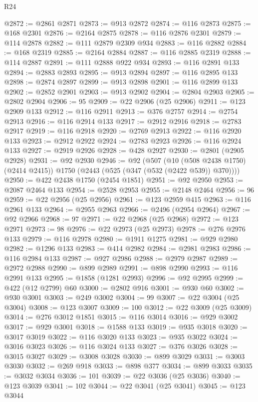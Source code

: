 \begin{lexlean}{R24}
\begin{coremodule}
{{{{{{{{{{{{{{{{{{{{{{{{{{{{{{{{{{{{{{{{{{{{{{{{{{{{{{{{{{{{{{{{{{{{{{{{{{{{{{{{{{{{{{{{{{{{{{{{{{{{{{{{{{{{{{{{{{{{{{{{{{{{{{{{{{{{{{{{{{{{{{{{{{{{{{{{{{{{{{{{{{{{{{{{{{{{{{{{{{{{{{{{{{{{{{{{{{{@2872 := @2861 @2871
@2873 := @913 @2872
@2874 := @116 @2873
@2875 := @168 @2301
@2876 := @2164 @2875
@2878 := @116 @2876 @2301
@2879 := @114 @2878
@2882 := @111 @2879 @2309 @934
@2883 := @116 @2882
@2884 := @168 @2319
@2885 := @2164 @2884
@2887 := @116 @2885 @2319
@2888 := @114 @2887
@2891 := @111 @2888 @922 @934
@2893 := @116 @2891 @133
@2894 := @2883 @2893
@2895 := @913 @2894
@2897 := @116 @2895 @133
@2898 := @2874 @2897
@2899 := @913 @2898
@2901 := @116 @2899 @133
@2902 := @2852 @2901
@2903 := @913 @2902
@2904 := @2804 @2903
@2905 := @2802 @2904
@2906 := 95
@2909 := @22 @2906 (@25 @2906)
@2911 := @123 @2909 @133
@2912 := @116 @2911
@2913 := @376 @2757
@2914 := @2754 @2913
@2916 := @116 @2914 @133
@2917 := @2912 @2916
@2918 := @2783 @2917
@2919 := @116 @2918
@2920 := @2769 @2913
@2922 := @116 @2920 @133
@2923 := @2912 @2922
@2924 := @2783 @2923
@2926 := @116 @2924 @133
@2927 := @2919 @2926
@2928 := @428 @2927
@2930 := @2801 (@2905 @2928)
@2931 := @92 @2930
@2946 := @92
    (@507
      (@10 (@508 @2438 @1750) (@2414 @2415))
      @1750
      (@2443 (@525 (@347 (@532 (@2422 @539)) @370))))
@2950 := @422 @2438 @1750 (@2454 @1851)
@2951 := @92 @2950
@2953 := @2087 @2464 @133
@2954 := @2528 @2953
@2955 := @2148 @2464
@2956 := 96
@2959 := @22 @2956 (@25 @2956)
@2961 := @123 @2959 @415
@2963 := @116 @2961 @133
@2964 := @2955 @2963
@2966 := @2496 (@2954 @2964)
@2967 := @92 @2966
@2968 := 97
@2971 := @22 @2968 (@25 @2968)
@2972 := @123 @2971
@2973 := 98
@2976 := @22 @2973 (@25 @2973)
@2978 := @276 @2976 @133
@2979 := @116 @2978
@2980 := @1911 @1275
@2981 := @929 @2980
@2982 := @1296 @133
@2983 := @414 @2982
@2984 := @2981 @2983
@2986 := @116 @2984 @133
@2987 := @927 @2986
@2988 := @2979 @2987
@2989 := @2972 @2988
@2990 := @899 @2989
@2991 := @898 @2990
@2993 := @116 @2991 @133
@2995 := @1858 (@1281 @2993)
@2996 := @92 @2995
@2999 := @422 (@12 @2799) @60
@3000 := @2802 @916
@3001 := @930 @60
@3002 := @930 @3001
@3003 := @249 @3002
@3004 := 99
@3007 := @22 @3004 (@25 @3004)
@3008 := @123 @3007
@3009 := 100
@3012 := @22 @3009 (@25 @3009)
@3014 := @276 @3012 @1851
@3015 := @116 @3014
@3016 := @929 @3002
@3017 := @929 @3001
@3018 := @1588 @133
@3019 := @935 @3018
@3020 := @3017 @3019
@3022 := @116 @3020 @133
@3023 := @935 @3022
@3024 := @3016 @3023
@3026 := @116 @3024 @133
@3027 := @376 @3026
@3028 := @3015 @3027
@3029 := @3008 @3028
@3030 := @899 @3029
@3031 := @3003 @3030
@3032 := @269 @918
@3033 := @898 @377
@3034 := @899 @3033
@3035 := @3032 @3034
@3036 := 101
@3039 := @22 @3036 (@25 @3036)
@3040 := @123 @3039
@3041 := 102
@3044 := @22 @3041 (@25 @3041)
@3045 := @123 @3044
}}}}}}}}}}}}}}}}}}}}}}}}}}}}}}}}}}}}}}}}}}}}}}}}}}}}}}}}}}}}}}}}}}}}}}}}}}}}}}}}}}}}}}}}}}}}}}}}}}}}}}}}}}}}}}}}}}}}}}}}}}}}}}}}}}}}}}}}}}}}}}}}}}}}}}}}}}}}}}}}}}}}}}}}}}}}}}}}}}}}}}}}}}}}}}}}}}}
\end{coremodule}
\end{lexlean}
